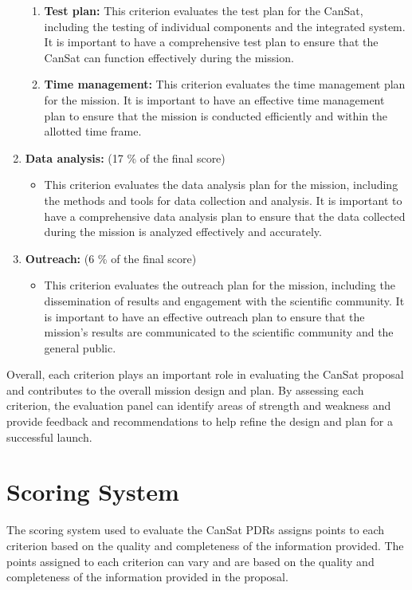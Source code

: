 \documentclass[11pt]{article}
\begin{document}
\begin{enumerate}
\begin{enumerate}
        \item {\textbf{Test plan:}} This criterion evaluates the test plan for the CanSat, including the testing of individual components and the integrated system. It is important to have a comprehensive test plan to ensure that the CanSat can function effectively during the mission.
        
        \item {\textbf{Time management:}} This criterion evaluates the time management plan for the mission. It is important to have an effective time management plan to ensure that the mission is conducted efficiently and within the allotted time frame.
    \end{enumerate}

    \item {\textbf{Data analysis:} (17 \% of the final score)} 
    \begin{itemize}
        \item[] This criterion evaluates the data analysis plan for the mission, including the methods and tools for data collection and analysis. It is important to have a comprehensive data analysis plan to ensure that the data collected during the mission is analyzed effectively and accurately.
    \end{itemize}

    \item {\textbf{Outreach:} (6 \% of the final score)} 
     \begin{itemize}
        \item[] This criterion evaluates the outreach plan for the mission, including the dissemination of results and engagement with the scientific community. It is important to have an effective outreach plan to ensure that the mission's results are communicated to the scientific community and the general public.
    \end{itemize}    
\end{enumerate} 

Overall, each criterion plays an important role in evaluating the CanSat proposal and contributes to the overall mission design and plan. By assessing each criterion, the evaluation panel can identify areas of strength and weakness and provide feedback and recommendations to help refine the design and plan for a successful launch.

\section{Scoring System}
The scoring system used to evaluate the CanSat PDRs assigns points to each criterion based on the quality and completeness of the information provided. The points assigned to each criterion can vary and are based on the quality and completeness of the information provided in the proposal.
\end{document}
